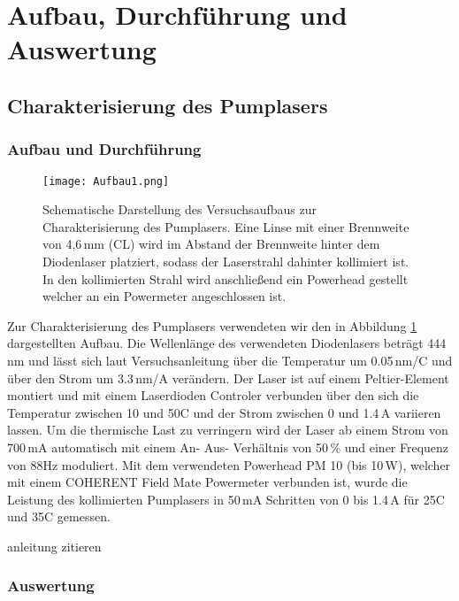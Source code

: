 \section{Aufbau, Durchführung und Auswertung}

\subsection{Charakterisierung des Pumplasers}


\subsubsection{Aufbau und Durchführung}

\begin{figure}[H]
\begin{center}
  \texttt{[image: Aufbau1.png]}
  \caption{Schematische Darstellung des Versuchsaufbaus zur Charakterisierung des Pumplasers. Eine Linse mit einer Brennweite von 4,6\,mm (CL) wird im Abstand der Brennweite hinter dem Diodenlaser platziert, sodass der Laserstrahl dahinter kollimiert ist. In den kollimierten Strahl wird anschließend ein Powerhead gestellt welcher an ein Powermeter angeschlossen ist.}
  \label{img:aufbau1}
\end{center}
\end{figure}

Zur Charakterisierung des Pumplasers verwendeten wir den in Abbildung \ref{img:aufbau1} dargestellten Aufbau. Die Wellenlänge des verwendeten Diodenlasers beträgt 444\,nm und lässt sich laut Versuchsanleitung über die Temperatur um 0.05\,nm/\grad C und über den Strom um 3.3\,nm/A verändern. Der Laser ist auf einem Peltier-Element montiert und mit einem Laserdioden Controler verbunden über den sich die Temperatur zwischen 10 und 50\grad C und der Strom zwischen 0 und 1.4\,A variieren lassen. Um die thermische Last zu verringern wird der Laser ab einem Strom von 700\,mA automatisch mit einem An- Aus- Verhältnis von 50\,\% und einer Frequenz von 88Hz moduliert.
Mit dem verwendeten Powerhead PM 10 (bis 10\,W), welcher mit einem COHERENT Field Mate Powermeter verbunden ist, wurde die Leistung des kollimierten Pumplasers in 50\,mA Schritten von 0 bis 1.4\,A für 25\grad C und 35\grad C gemessen.


anleitung zitieren
\subsubsection{Auswertung}

